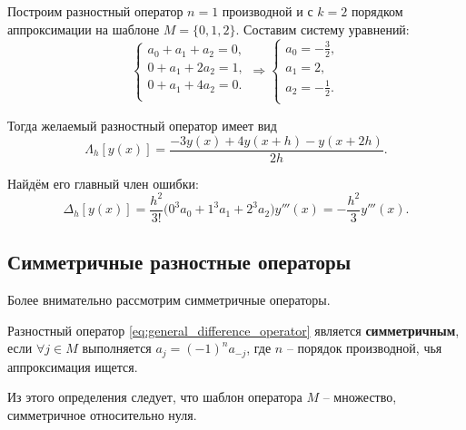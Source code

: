 \documentclass[../main.tex]{subfile}
\begin{document}
\begin{example}
	Построим разностный оператор $n=1$ производной и с $k=2$ порядком
	аппроксимации на шаблоне $M=\{0,1,2\}$. Составим систему уравнений:
	\begin{equation*}
		\begin{cases}
			a_0+a_1+a_2=0, \\
			0+a_1+2a_2=1, \\
			0+a_1+4a_2=0. \\
		\end{cases}
		\Rightarrow
		\begin{cases}
			a_0 = -\frac{3}{2}, \\
			a_1 = 2, \\
			a_2 = -\frac{1}{2}. \\
		\end{cases}
	\end{equation*}

	Тогда желаемый разностный оператор имеет вид
	\[\Lambda_h[y(x)]=\frac{-3y(x)+4y(x+h)-y(x+2h)}{2h}.\]

	Найдём его главный член ошибки:
	\[\Delta_h[y(x)]=\frac{h^2}{3!}\big(0^3a_0+1^3a_1+2^3a_2\big)y'''(x)=
	-\frac{h^2}{3}y'''(x).\]
\end{example}
\newpage

\subsection{Симметричные разностные операторы}
Более внимательно рассмотрим симметричные операторы.

\begin{define}\label{eq:central_difference_operator}
	Разностный оператор \eqref{eq:general_difference_operator} является
	\textbf{симметричным}, если $\forall j\in M$ выполняется
	$a_j=(-1)^na_{-j}$, где $n$ -- порядок производной, чья аппроксимация
	ищется.
\end{define}

Из этого определения следует, что шаблон оператора $M$ -- множество,
симметричное относительно нуля.
\end{document}
